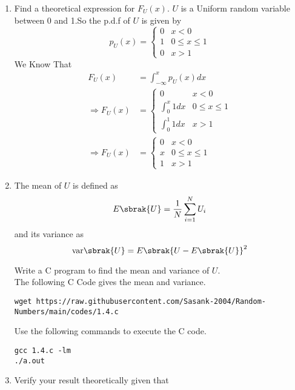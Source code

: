 \documentclass[journal,12pt,twocolumn]{IEEEtran}
\renewcommand\thesection{\arabic{section}}
\begin{document}
\begin{enumerate}[label=\thesection.\arabic*
,ref=\thesection.\theenumi]
%
\item
Find a  theoretical expression for $F_{U}(x)$.
\solution $U$ is a Uniform random variable between 0 and 1.So the p.d.f of $U$ is given by \\
\begin{equation}
    p_U(x) = 
    \begin{cases}
    0 & x < 0 \\
    1 & 0 \le x \le 1 \\
    0 & x > 1 
    \end{cases}
\end{equation}
We Know That 
\begin{align}
    F_U(x) &=  \int_{-\infty}^{x} p_U(x)dx  \\
    \Rightarrow F_U(x) &= 
    \begin{cases}
    0 & x < 0 \\
    \int_{0}^{x} 1dx &  0 \le x \le 1 \\
    \int_{0}^{1} 1dx & x > 1 
    \end{cases} \\
    \Rightarrow F_U(x) &= 
    \begin{cases}
    0 & x < 0 \\
    x &  0 \le x \le 1 \\
    1 & x > 1 
    \end{cases} 
\end{align}
\item
The mean of $U$ is defined as
%
\begin{equation}
E\sbrak{U} = \frac{1}{N}\sum_{i=1}^{N}U_i
\end{equation}
%
and its variance as
%
\begin{equation}
\text{var}\sbrak{U} = E\sbrak{U- E\sbrak{U}}^2 
\end{equation}

Write a C program to  find the mean and variance of $U$. \\
\solution The following C Code gives the mean and variance. 
\begin{lstlisting}
wget https://raw.githubusercontent.com/Sasank-2004/Random-Numbers/main/codes/1.4.c
\end{lstlisting}
Use the following commands to execute the C code.
\begin{lstlisting}
gcc 1.4.c -lm
./a.out
\end{lstlisting}
\item Verify your result theoretically given that


\end{enumerate}
\end{document}
